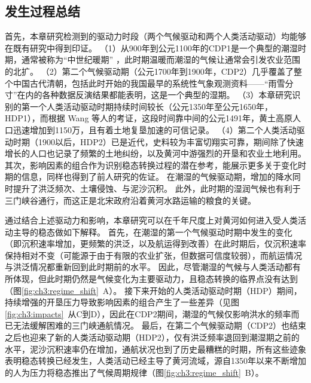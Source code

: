 \subsection{发生过程总结}
首先，本章研究检测到的驱动力时段（两个气候驱动和两个人类活动驱动）均能够在既有研究中得到印证。
（1）从900年到公元1100年的CDP1是一个典型的潮湿时期，通常被称为“中世纪暖期” \cite{zhang1993, zhang1994, man2014}，此时期温暖而潮湿的气候让通常会引发农业范围的北扩\cite{TanQiXiang1996,GeQuanSheng2011}。
（2）第二个气候驱动期（公元1700年到1900年，CDP2）几乎覆盖了整个中国古代清朝，包括此时开始的我国最早的系统性气象观测资料——“雨雪分寸”在内的各种数据反演结果都能表明，这是一个典型的湿期\cite{hao2021, ge2008}。
（3）本章研究识别的第一个人类活动驱动时期持续时间较长（公元1350年至公元1650年，HDP1），而根据 Wang 等人的考证，这段时间靠中间的公元1491年，黄土高原人口迅速增加到1150万，且有着土地复垦加速的可信记录\cite{wang2006b}。
（4）第二个人类活动驱动时期（1900以后，HDP2）已是近代，史料较为丰富切翔实可靠，期间除了快速增长的人口也记录了频繁的土地纠纷，以及黄河中游强烈的开垦和农业土地利用\cite{GeJianXiong2005}。
其次，影响因素的组合作为识别稳态转换过程的潜在参考，能展示更多关于变化时期的信息，同样也得到了前人研究的佐证。
在潮湿的气候驱动期，增加的降水同时提升了洪泛频次、土壤侵蚀、与泥沙沉积\cite{chen2012}。
此外，此时期的湿润气候也有利于三门峡谷通行，而这正是北宋政府沿着黄河水路运输的粮食的关键\cite{WangShouChun1993}。

通过结合上述驱动力和影响，本章研究可以在千年尺度上对黄河如何进入受人类活动主导的稳态做如下解释。
首先，在潮湿的第一个气候驱动时期中发生的变化（即沉积速率增加，更频繁的洪泛，以及航运得到改善）在此时期后，仅沉积速率保持相对不变（可能源于由于有限的农业扩张，但数据可信度较弱），而航运情况与洪泛情况都重新回到此时期前的水平。
因此，尽管潮湿的气候与人类活动都有所体现，但此时期仍然是气候变化为主要驱动力，且稳态转换的临界点没有达到（图\ref{fig:ch3:regime_shift}~A）。
接下来开始的人类活动驱动时期（HDP）期间，持续增强的开垦压力导致影响因素的组合产生了一些差异（见图\ref{fig:ch3:impacts}~从C到D），因此在CDP2期间，潮湿的气候仅影响洪水的频率而已无法缓解困难的三门峡通航情况。
最后，在第二个气候驱动期（CDP2）也结束之后也迎来了新的人类活动驱动期（HDP2），仅有洪泛频率退回到潮湿期之前的水平，泥沙沉积速率仍在增加，通航状况也到了历史最糟糕的时期，所有这些迹象表明稳态转换已经发生，人类活动已经主导了黄河流域，源自1350年以来不断增加的人为压力将稳态推出了气候周期规律（图\ref{fig:ch3:regime_shift}~B）。


